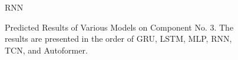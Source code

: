\begin{figure}[H]
\begin{minipage}[t]{\linewidth}
		\caption*{RNN}
	\end{minipage}
	\caption{Predicted Results of Various Models on Component No. 3. The results are presented in the order of GRU, LSTM, MLP, RNN, TCN, and Autoformer.}
	\label{fig:Prediction_All_Model}
\end{figure}